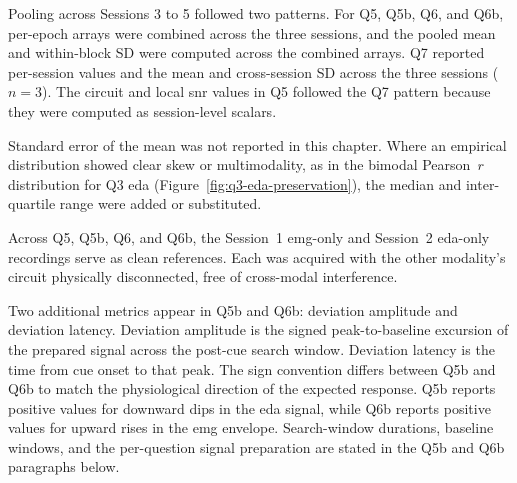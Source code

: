 Pooling across Sessions 3 to 5 followed two patterns. For Q5, Q5b, Q6, and Q6b, per-epoch arrays were combined across the three sessions, and the pooled mean and within-block SD were computed across the combined arrays. Q7 reported per-session values and the mean and cross-session SD across the three sessions ($n = 3$). The circuit and local \gls{snr} values in Q5 followed the Q7 pattern because they were computed as session-level scalars.

Standard error of the mean was not reported in this chapter. Where an empirical distribution showed clear skew or multimodality, as in the bimodal Pearson~$r$ distribution for Q3 \gls{eda} (Figure~\ref{fig:q3-eda-preservation}), the median and inter-quartile range were added or substituted.

Across Q5, Q5b, Q6, and Q6b, the Session~1 \gls{emg}-only and Session~2 \gls{eda}-only recordings serve as clean references. Each was acquired with the other modality's circuit physically disconnected, free of cross-modal interference.

Two additional metrics appear in Q5b and Q6b: deviation amplitude and deviation latency. Deviation amplitude is the signed peak-to-baseline excursion of the prepared signal across the post-cue search window. Deviation latency is the time from cue onset to that peak. The sign convention differs between Q5b and Q6b to match the physiological direction of the expected response. Q5b reports positive values for downward dips in the \gls{eda} signal, while Q6b reports positive values for upward rises in the \gls{emg} envelope. Search-window durations, baseline windows, and the per-question signal preparation are stated in the Q5b and Q6b paragraphs below.


